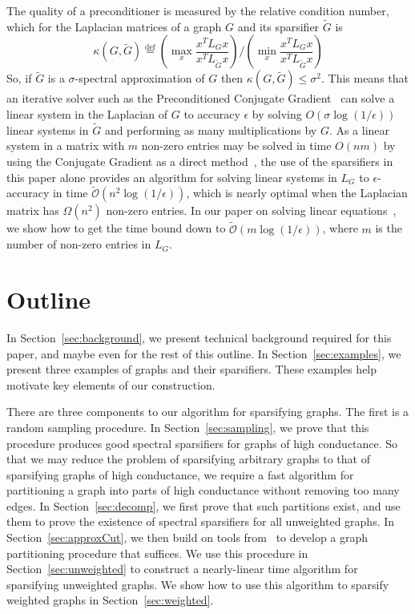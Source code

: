 \documentclass[11pt]{article}
\def\Gtil{\widetilde{G}}
\def\softO#1{\widetilde{\mathcal{O}} \left( #1 \right)}
\def\defeq{\stackrel{\mathrm{def}}{=}}
\begin{document}
The quality of a preconditioner is measured by the relative condition number,
  which for the Laplacian matrices of a graph $G$ and its sparsifier $\Gtil$ is
\[
\kappa (G, \Gtil) \defeq
 \left( \max_{x} \frac{x^{T} L_{G} x}{x^{T} L_{\Gtil } x} \right)
\Big/
 \left(  \min_{x} \frac{x^{T} L_{G} x}{x^{T} L_{\Gtil } x} \right)
\]
So, if $\Gtil$ is a $\sigma $-spectral approximation of $G$ then
  $\kappa (G, \Gtil) \leq \sigma^{2}$.
This means that
  an iterative solver such as the Preconditioned Conjugate Gradient~\cite{Axelsson}
 can solve a linear system in the Laplacian of
  $G$ to accuracy $\epsilon$ by solving $O (\sigma \log (1/\epsilon ))$
  linear systems in
  $\Gtil$ and performing as many multiplications by $G$.
As a linear system in a matrix with $m$ non-zero entries may be solved
  in time $O (n m)$ by using the Conjugate Gradient as a
  direct method~\cite[Theorem~28.3]{TrefethenBau},
 the use of the sparsifiers in this paper alone provides an
  algorithm for solving linear systems in $L_{G}$ to $\epsilon$-accuracy in
  time $\softO{n^{2} \log (1/\epsilon)}$, which is nearly optimal when
  the Laplacian matrix has $\Omega(n^2)$ non-zero entries.
In our paper on solving linear equations~\cite{SpielmanTengLinsolve}, we show
  how to get the time bound down to $\softO{m \log (1/\epsilon)}$,
  where $m$ is the number of non-zero entries in $L_{G}$.





\section{Outline}
In Section~\ref{sec:background}, we present technical background required
  for this paper, and maybe even for the rest of this outline.
In Section~\ref{sec:examples}, we present three examples of graphs and
  their sparsifiers.
These examples help motivate key elements of our construction.


There are three components to our algorithm for sparsifying graphs.
The first is a random sampling procedure.
In Section~\ref{sec:sampling}, we prove that this procedure produces
  good spectral sparsifiers for graphs of high conductance.
So that we may reduce the problem of sparsifying arbitrary graphs
  to that of sparsifying graphs of high conductance, we require
  a fast algorithm for partitioning a graph into parts of high conductance
  without removing too many edges.
In Section~\ref{sec:decomp}, we first prove that such partitions exist,
  and use them to prove the existence of spectral sparsifiers for
  all unweighted graphs.
In Section~\ref{sec:approxCut}, we then build on tools from~\cite{SpielmanTengCuts}
  to develop a graph partitioning procedure that suffices.
We use this procedure in Section~\ref{sec:unweighted} to construct
  a nearly-linear time algorithm
  for sparsifying unweighted graphs.
We show how to use this algorithm to sparsify
  weighted graphs in Section~\ref{sec:weighted}.
\end{document}
